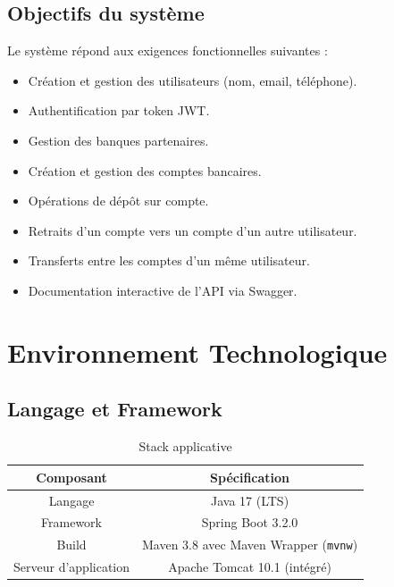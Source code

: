 \documentclass[12pt,a4paper]{article}
\newcommand{\tableheader}[1]{\textbf{#1}}
\begin{document}
\subsection{Objectifs du système}
Le système répond aux exigences fonctionnelles suivantes :

\begin{itemize}
    \item Création et gestion des utilisateurs (nom, email, téléphone).
    \item Authentification par token JWT.
    \item Gestion des banques partenaires.
    \item Création et gestion des comptes bancaires.
    \item Opérations de dépôt sur compte.
    \item Retraits d'un compte vers un compte d'un autre utilisateur.
    \item Transferts entre les comptes d'un même utilisateur.
    \item Documentation interactive de l'API via Swagger.
\end{itemize}

\section{Environnement Technologique}

\subsection{Langage et Framework}

\begin{table}[H]
    \centering
    \renewcommand{\arraystretch}{1.3}
    \begin{tabular}{|c|c|}
        \hline
        \tableheader{Composant} & \tableheader{Spécification} \\
        \hline
        Langage & Java 17 (LTS) \\
        \hline
        Framework & Spring Boot 3.2.0 \\
        \hline
        Build & Maven 3.8 avec Maven Wrapper (\texttt{mvnw}) \\
        \hline
        Serveur d'application & Apache Tomcat 10.1 (intégré) \\
        \hline
    \end{tabular}
    \caption{Stack applicative}
\end{table}
\end{document}
